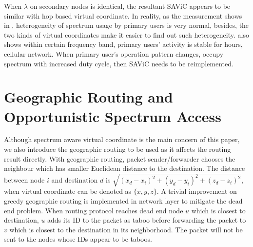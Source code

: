  

When $\lambda$ on secondary nodes is identical, the resultant SAViC appears to be similar with hop based virtual coordinate.
In reality, as the measurement shows in \cite{measurement_Palaios14}, heterogeneity of spectrum usage by primary users is very normal, besides, the two kinds of virtual coordinates make it easier to find out such heterogeneity.
\cite{measurement_Palaios14} also shows within certain frequency band, primary users' activity is stable for hours, \eg cellular network.
When primary user's operation pattern changes, \eg occupy spectrum with increased duty cycle, then SAViC needs to be reimplemented.

\section{Geographic Routing and Opportunistic Spectrum Access}
\label{osa}
Although spectrum aware virtual coordinate is the main concern of this paper, we also introduce the geographic routing to be used as it affects the routing result directly.
With geographic routing, packet sender/forwarder chooses the neighbour which has smaller Euclidean distance to the destination.
The distance between node $i$ and destination $d$ is $\sqrt{(x_d-x_i)^2+(y_d-y_i)^2+(z_d-z_i)^2}$, when virtual coordinate can be denoted as $\{x, y, z\}$.
A trivial improvement on greedy geographic routing is implemented in network layer to mitigate the dead end problem.
When routing protocol reaches dead end node $u$ which is closest to destination, $u$ adds its ID to the packet as taboo before forwarding the packet to $v$ which is closest to the destination in its neighborhood.
The packet will not be sent to the nodes whose IDs appear to be taboos.

